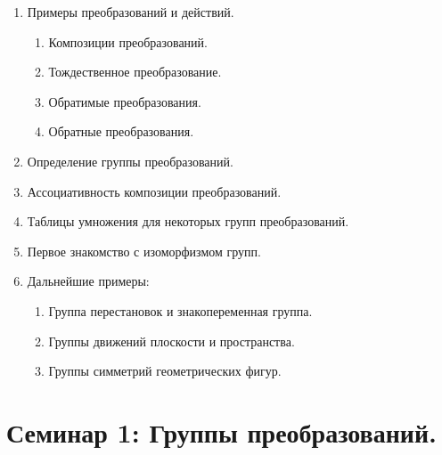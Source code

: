 \documentclass[amsmath,amssymb,12pt]{revtex4}
\newif\ifimportant
\newcommand{\1}{\frac{1}{2}}
\begin{document}
\begin{enumerate}
	\item Примеры преобразований и действий. 
		\begin{enumerate}
			\item Композиции преобразований. 
			\item Тождественное преобразование.
			\item Обратимые преобразования.
			\item Обратные преобразования.
		\end{enumerate}
	\item Определение группы преобразований.
	\item Ассоциативность композиции преобразований.
	\item Таблицы умножения для некоторых групп преобразований.
	\item Первое знакомство с изоморфизмом групп. 
	\item Дальнейшие примеры:
		\begin{enumerate}
			\item Группа перестановок и знакопеременная группа.
			\item Группы движений плоскости и пространства.
			\item Группы симметрий геометрических фигур.
		\end{enumerate}
\end{enumerate}



\newpage
\section*{\large Семинар 1: Группы преобразований.}
\setcounter{prn}{0}
\importantfalse %

%
%
%
\end{document}
